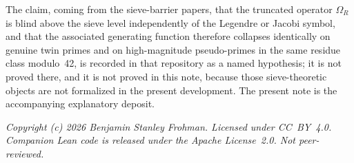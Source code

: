 \documentclass[11pt,a4paper]{article}
\begin{document}
The claim, coming from the sieve-barrier papers, that the truncated operator \(\Omega_R\) is blind above the sieve level independently of the Legendre or Jacobi symbol, and that the associated generating function therefore collapses identically on genuine twin primes and on high-magnitude pseudo-primes in the same residue class modulo~42, is recorded in that repository as a named hypothesis; it is not proved there, and it is not proved in this note, because those sieve-theoretic objects are not formalized in the present development. The present note is the accompanying explanatory deposit.

\vspace{1em}
\noindent\textit{Copyright (c) 2026 Benjamin Stanley Frohman. Licensed under CC~BY~4.0. Companion Lean code is released under the Apache License~2.0. Not peer-reviewed.}
\end{document}
